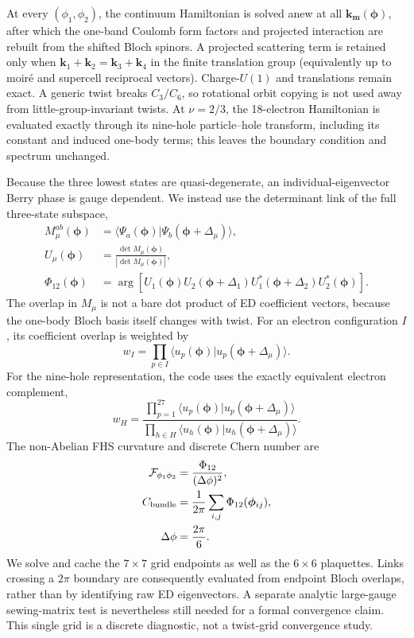 \documentclass[10pt,twocolumn]{article}
\begin{document}
At every $(\phi_1,\phi_2)$, the continuum Hamiltonian is solved anew at all
$\bm k_{\bm m}(\bm\phi)$, after which the one-band Coulomb form factors and
projected interaction are rebuilt from the shifted Bloch spinors.  A projected
scattering term is retained only when
$\bm k_1+\bm k_2=\bm k_3+\bm k_4$ in the finite translation group (equivalently
up to moir\'e and supercell reciprocal vectors).  Charge-$U(1)$ and translations
remain exact.  A generic twist breaks $C_3/C_6$, so rotational orbit copying is
not used away from little-group-invariant twists.  At $\nu=2/3$, the 18-electron
Hamiltonian is evaluated exactly through its nine-hole particle--hole
transform, including its constant and induced one-body terms; this leaves the
boundary condition and spectrum unchanged.

Because the three lowest states are quasi-degenerate, an individual-eigenvector
Berry phase is gauge dependent.  We instead use the determinant link of the
full three-state subspace,
\begin{align}
M_\mu^{ab}(\bm\phi)&=\langle\Psi_a(\bm\phi)|\Psi_b(\bm\phi+\Delta_\mu)\rangle,\\
U_\mu(\bm\phi)&=\frac{\det M_\mu(\bm\phi)}{|\det M_\mu(\bm\phi)|},\\
\Phi_{12}(\bm\phi)&=\arg\!\left[U_1(\bm\phi)U_2(\bm\phi+\Delta_1)
U_1^*(\bm\phi+\Delta_2)U_2^*(\bm\phi)\right].
\end{align}
The overlap in $M_\mu$ is not a bare dot product of ED coefficient vectors,
because the one-body Bloch basis itself changes with twist.  For an electron
configuration $I$, its coefficient overlap is weighted by
\begin{equation}
 w_I=\prod_{p\in I}\langle u_p(\bm\phi)|u_p(\bm\phi+\Delta_\mu)\rangle.
 \label{eq:electron-overlap-weight}
\end{equation}
For the nine-hole representation, the code uses the exactly equivalent electron
complement,
\begin{equation}
 w_H=\frac{\prod_{p=1}^{27}\langle u_p(\bm\phi)|u_p(\bm\phi+\Delta_\mu)\rangle}
 {\prod_{h\in H}\langle u_h(\bm\phi)|u_h(\bm\phi+\Delta_\mu)\rangle}.
 \label{eq:hole-overlap-weight}
\end{equation}
The non-Abelian FHS curvature and discrete Chern number are
\begin{equation}
 \begin{aligned}
 \mathcal F_{\phi_1\phi_2}&=\frac{\Phi_{12}}{(\Delta\phi)^2},\\
 C_{\rm bundle}&=\frac{1}{2\pi}\sum_{i,j}\Phi_{12}(\bm\phi_{ij}),\\
 \Delta\phi&=\frac{2\pi}{6}.
 \end{aligned}
 \label{eq:fhs-chern}
\end{equation}
We solve and cache the $7\times7$ grid endpoints as well as the $6\times6$
plaquettes.  Links crossing a $2\pi$ boundary are consequently evaluated from
endpoint Bloch overlaps, rather than by identifying raw ED eigenvectors.  A
separate analytic large-gauge sewing-matrix test is nevertheless still needed
for a formal convergence claim.  This single grid is a discrete diagnostic,
not a twist-grid convergence study.
\end{document}
